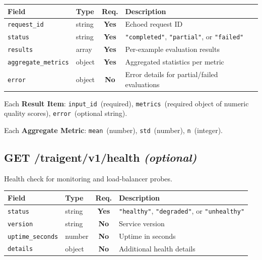 \documentclass[11pt,a4paper]{article}
\newcommand{\field}[1]{\texttt{#1}}
\newcommand{\required}{\textbf{Yes}}
\newcommand{\optional}{\textbf{No}}
\newcommand{\status}[1]{\texttt{"#1"}}
\begin{document}
\begin{center}\small
\begin{tabularx}{\textwidth}{@{}llcX@{}}
\toprule
\textbf{Field} & \textbf{Type} & \textbf{Req.} & \textbf{Description} \\
\midrule
\field{request\_id}        & string & \required & Echoed request ID \\
\field{status}             & string & \required & \status{completed}, \status{partial}, or \status{failed} \\
\field{results}            & array  & \required & Per-example evaluation results \\
\field{aggregate\_metrics} & object & \required & Aggregated statistics per metric \\
\field{error}              & object & \optional & Error details for partial/failed evaluations \\
\bottomrule
\end{tabularx}
\end{center}

Each \textbf{Result Item}: \field{input\_id}~(required), \field{metrics}~(required object of numeric quality scores), \field{error}~(optional string).

Each \textbf{Aggregate Metric}: \field{mean}~(number), \field{std}~(number), \field{n}~(integer).

\subsection{GET /traigent/v1/health \normalfont\textit{(optional)}}

Health check for monitoring and load-balancer probes.

\begin{center}\small
\begin{tabularx}{\textwidth}{@{}llcX@{}}
\toprule
\textbf{Field} & \textbf{Type} & \textbf{Req.} & \textbf{Description} \\
\midrule
\field{status}          & string & \required & \status{healthy}, \status{degraded}, or \status{unhealthy} \\
\field{version}         & string & \optional & Service version \\
\field{uptime\_seconds} & number & \optional & Uptime in seconds \\
\field{details}         & object & \optional & Additional health details \\
\bottomrule
\end{tabularx}
\end{center}
\end{document}
